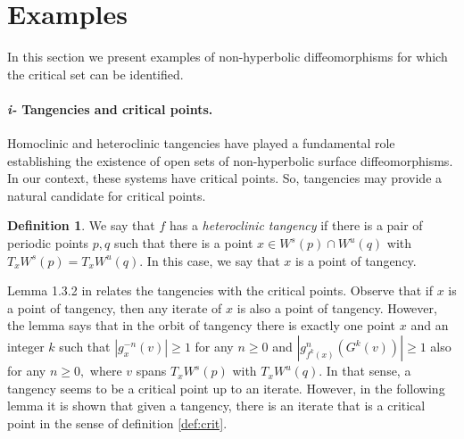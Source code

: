 \documentclass[a4paper,11pt]{article}
\newtheorem{theorem}{Theorem}
\theoremstyle{definition}
\newtheorem{definition}[lemma]{Definition}
\def\La{\Lambda}
\def\La{\Lambda}
\begin{document}
 





\section{Examples}
\label{examples}

In this section we present examples of non-hyperbolic diffeomorphisms for which the critical set can be identified.


\paragraph{{\em i-} Tangencies and critical points.}

Homoclinic and heteroclinic tangencies have played a fundamental role establishing the existence of open sets of non-hyperbolic surface diffeomorphisms. In our context, these systems have critical points.  So, tangencies may provide a natural candidate for critical points.

\begin{definition} We say that $f$
has a {\it heteroclinic tangency} if there is a pair of periodic points $p, q$ such that
there is a point $x\in W^s(p)\cap W^u(q)$ with $T_xW^s(p)=
T_xW^u(q).$ In this case, we say that $x$ is a point of tangency.
\end{definition}


Lemma 1.3.2 in \cite{PRH}  relates the tangencies with the critical points.
Observe that if $x$ is a point of tangency, then any iterate of $x$ is also a point of
tangency. However, the lemma says that in the orbit of tangency there is exactly one   point $x$ and an integer $k$  such that $|g^{-n}_x(v)|\geq 1$ for any $n\geq 0$  and $|g^n_{f^k(x)}(G^k(v))|\geq 1$ also for any $n\geq 0,$ where $v$ spans  $T_xW^s(p)$ with $T_xW^u(q)$. In that sense, a tangency seems to be  a critical point up to an iterate. However, in the following lemma it is shown that given a tangency, there is an iterate that is a critical point in the sense of definition \ref{def:crit}.
\end{document}
